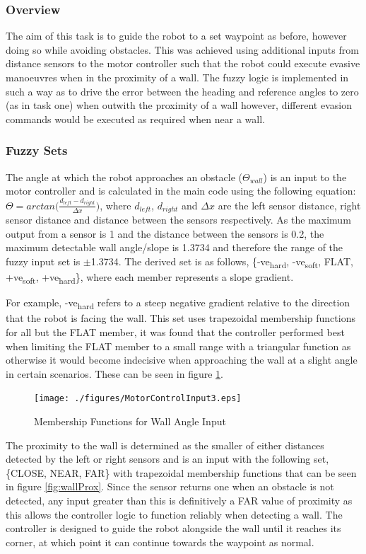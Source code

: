 \documentclass[10pt]{article}
\begin{document}
\subsubsection{Overview}
The aim of this task is to guide the robot to a set waypoint as before, however doing so while avoiding obstacles.
This was achieved using additional inputs from distance sensors to the motor controller such that the robot could execute evasive manoeuvres when in the proximity of a wall.
The fuzzy logic is implemented in such a way as to drive the error between the heading and reference angles to zero (as in task one) when outwith the proximity of a wall however, different evasion commands would be executed as required when near a wall.

\subsubsection{Fuzzy Sets}
The angle at which the robot approaches an obstacle ($\Theta_{wall}$) is an input to the motor controller and is calculated in the main code using the following equation:
$\Theta = arctan\bigg(\frac{d_{left}-d_{right}}{\Delta x}\bigg)$,
where $d_{left}$, $d_{right}$ and $\Delta x$ are the left sensor distance, right sensor distance and distance between the sensors respectively.
As the maximum output from a sensor is 1 and the distance between the sensors is 0.2, the maximum detectable wall angle/slope is 1.3734 and therefore the range of the fuzzy input set is $\pm$1.3734.
The derived set is as follows, \{-ve\textsubscript{hard}, -ve\textsubscript{soft}, FLAT, +ve\textsubscript{soft}, +ve\textsubscript{hard}\}, where each member represents a slope gradient.

\medskip
For example, -ve\textsubscript{hard} refers to a steep negative gradient relative to the direction that the robot is facing the wall.
This set uses trapezoidal membership functions for all but the FLAT member, it was found that the controller performed best when limiting the FLAT member to a small range with a triangular function as otherwise it would become indecisive when approaching the wall at a slight angle in certain scenarios. 
These can be seen in figure \ref{fig:wallSlope}.
\begin{figure}[H]
    \centering
\texttt{[image: ./figures/MotorControlInput3.eps]}
\caption{Membership Functions for Wall Angle Input}
\label{fig:wallSlope}
\end{figure}

The proximity to the wall is determined as the smaller of either distances detected by the left or right sensors and is an input with the following set, \{CLOSE, NEAR, FAR\} with trapezoidal membership functions that can be seen in figure \ref{fig:wallProx}.
Since the sensor returns one when an obstacle is not detected, any input greater than this is definitively a FAR value of proximity as this allows the controller logic to function reliably when detecting a wall. 
The controller is designed to guide the robot alongside the wall until it reaches its corner, at which point it can continue towards the waypoint as normal.
\end{document}
